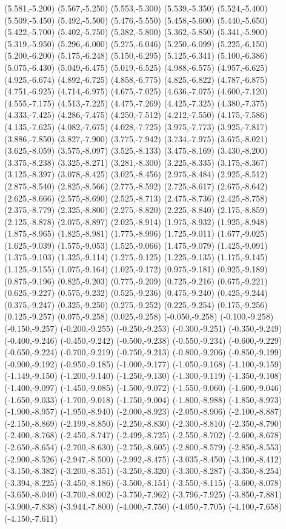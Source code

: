 (5.581,-5.200) (5.567,-5.250) (5.553,-5.300) (5.539,-5.350) (5.524,-5.400) (5.509,-5.450) (5.492,-5.500) (5.476,-5.550) (5.458,-5.600) (5.440,-5.650) (5.422,-5.700) (5.402,-5.750) (5.382,-5.800) (5.362,-5.850) (5.341,-5.900) (5.319,-5.950) (5.296,-6.000) (5.275,-6.046) (5.250,-6.099) (5.225,-6.150) (5.200,-6.200) (5.175,-6.248) (5.150,-6.295) (5.125,-6.341) (5.100,-6.386) (5.075,-6.430) (5.049,-6.475) (5.019,-6.525) (4.988,-6.575) (4.957,-6.625) (4.925,-6.674) (4.892,-6.725) (4.858,-6.775) (4.825,-6.822) (4.787,-6.875) (4.751,-6.925) (4.714,-6.975) (4.675,-7.025) (4.636,-7.075) (4.600,-7.120) (4.555,-7.175) (4.513,-7.225) (4.475,-7.269) (4.425,-7.325) (4.380,-7.375) (4.333,-7.425) (4.286,-7.475) (4.250,-7.512) (4.212,-7.550) (4.175,-7.586) (4.135,-7.625) (4.082,-7.675) (4.028,-7.725) (3.975,-7.773) (3.925,-7.817) (3.886,-7.850) (3.827,-7.900) (3.775,-7.942) (3.734,-7.975) (3.675,-8.021) (3.625,-8.059) (3.575,-8.097) (3.525,-8.133) (3.475,-8.169) (3.430,-8.200) (3.375,-8.238) (3.325,-8.271) (3.281,-8.300) (3.225,-8.335) (3.175,-8.367) (3.125,-8.397) (3.078,-8.425) (3.025,-8.456) (2.975,-8.484) (2.925,-8.512) (2.875,-8.540) (2.825,-8.566) (2.775,-8.592) (2.725,-8.617) (2.675,-8.642) (2.625,-8.666) (2.575,-8.690) (2.525,-8.713) (2.475,-8.736) (2.425,-8.758) (2.375,-8.779) (2.325,-8.800) (2.275,-8.820) (2.225,-8.840) (2.175,-8.859) (2.125,-8.878) (2.075,-8.897) (2.025,-8.914) (1.975,-8.932) (1.925,-8.948) (1.875,-8.965) (1.825,-8.981) (1.775,-8.996) (1.725,-9.011) (1.677,-9.025) (1.625,-9.039) (1.575,-9.053) (1.525,-9.066) (1.475,-9.079) (1.425,-9.091) (1.375,-9.103) (1.325,-9.114) (1.275,-9.125) (1.225,-9.135) (1.175,-9.145) (1.125,-9.155) (1.075,-9.164) (1.025,-9.172) (0.975,-9.181) (0.925,-9.189) (0.875,-9.196) (0.825,-9.203) (0.775,-9.209) (0.725,-9.216) (0.675,-9.221) (0.625,-9.227) (0.575,-9.232) (0.525,-9.236) (0.475,-9.240) (0.425,-9.244) (0.375,-9.247) (0.325,-9.250) (0.275,-9.252) (0.225,-9.254) (0.175,-9.256) (0.125,-9.257) (0.075,-9.258) (0.025,-9.258) (-0.050,-9.258) (-0.100,-9.258) (-0.150,-9.257) (-0.200,-9.255) (-0.250,-9.253) (-0.300,-9.251) (-0.350,-9.249) (-0.400,-9.246) (-0.450,-9.242) (-0.500,-9.238) (-0.550,-9.234) (-0.600,-9.229) (-0.650,-9.224) (-0.700,-9.219) (-0.750,-9.213) (-0.800,-9.206) (-0.850,-9.199) (-0.900,-9.192) (-0.950,-9.185) (-1.000,-9.177) (-1.050,-9.168) (-1.100,-9.159) (-1.149,-9.150) (-1.200,-9.140) (-1.250,-9.130) (-1.300,-9.119) (-1.350,-9.108) (-1.400,-9.097) (-1.450,-9.085) (-1.500,-9.072) (-1.550,-9.060) (-1.600,-9.046) (-1.650,-9.033) (-1.700,-9.018) (-1.750,-9.004) (-1.800,-8.988) (-1.850,-8.973) (-1.900,-8.957) (-1.950,-8.940) (-2.000,-8.923) (-2.050,-8.906) (-2.100,-8.887) (-2.150,-8.869) (-2.199,-8.850) (-2.250,-8.830) (-2.300,-8.810) (-2.350,-8.790) (-2.400,-8.768) (-2.450,-8.747) (-2.499,-8.725) (-2.550,-8.702) (-2.600,-8.678) (-2.650,-8.654) (-2.700,-8.630) (-2.750,-8.605) (-2.800,-8.579) (-2.850,-8.553) (-2.900,-8.526) (-2.947,-8.500) (-2.992,-8.475) (-3.035,-8.450) (-3.100,-8.412) (-3.150,-8.382) (-3.200,-8.351) (-3.250,-8.320) (-3.300,-8.287) (-3.350,-8.254) (-3.394,-8.225) (-3.450,-8.186) (-3.500,-8.151) (-3.550,-8.115) (-3.600,-8.078) (-3.650,-8.040) (-3.700,-8.002) (-3.750,-7.962) (-3.796,-7.925) (-3.850,-7.881) (-3.900,-7.838) (-3.944,-7.800) (-4.000,-7.750) (-4.050,-7.705) (-4.100,-7.658) (-4.150,-7.611) 